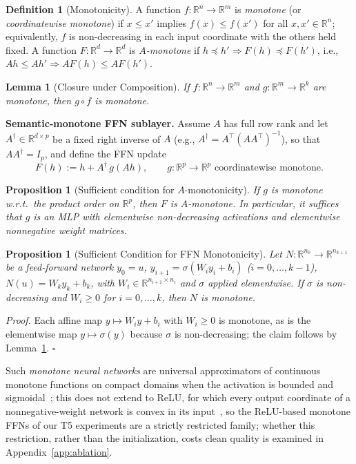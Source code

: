 \documentclass{article}
\theoremstyle{plain}
\newtheorem{proposition}[theorem]{Proposition}
\newtheorem{lemma}[theorem]{Lemma}
\theoremstyle{definition}
\newtheorem{definition}[theorem]{Definition}
\theoremstyle{remark}
\theoremstyle{plain}
\begin{document}
\begin{definition}[Monotonicity]
\label{def:monotone}
A function $f : \mathbb{R}^n \to \mathbb{R}^m$ is \emph{monotone} (or \emph{coordinatewise monotone}) if $x \le x'$ implies $f(x) \le f(x')$ for all $x, x' \in \mathbb{R}^n$; equivalently, $f$ is non-decreasing in each input coordinate with the others held fixed. A function $F:\mathbb{R}^d \to \mathbb{R}^d$ is \emph{$A$-monotone} if $h \preceq h' \Rightarrow F(h) \preceq F(h')$, i.e., $Ah \le Ah' \Rightarrow AF(h) \le AF(h')$.
\end{definition}

\begin{lemma}[Closure under Composition]
\label{lem:mono_comp}
If $f : \mathbb{R}^n \to \mathbb{R}^m$ and $g : \mathbb{R}^m \to \mathbb{R}^k$ are monotone, then $g \circ f$ is monotone.
\end{lemma}

\textbf{Semantic-monotone FFN sublayer.}
Assume $A$ has full row rank and let $A^\dagger \in \mathbb{R}^{d \times p}$ be a fixed right inverse of $A$ (e.g., $A^\dagger = A^\top(AA^\top)^{-1}$), so that $A A^\dagger = I_p$, and define the FFN update
\[
F(h) := h + A^\dagger\, g(Ah), \qquad g:\mathbb{R}^p \to \mathbb{R}^p \text{ coordinatewise monotone.}
\]

\begin{proposition}[Sufficient condition for $A$-monotonicity]
\label{prop:amono}
If $g$ is monotone w.r.t.\ the product order on $\mathbb{R}^p$, then $F$ is $A$-monotone.
In particular, it suffices that $g$ is an MLP with elementwise non-decreasing activations
and elementwise nonnegative weight matrices.
\end{proposition}

\begin{proposition}[Sufficient Condition for FFN Monotonicity]
\label{prop:ffn_mono}
Let $N : \mathbb{R}^{n_0} \to \mathbb{R}^{n_{k+1}}$ be a feed-forward network $y_0 = u$, $y_{i+1} = \sigma(W_i y_i + b_i)$ ($i = 0,\ldots,k-1$), $N(u) = W_k y_k + b_k$, with $W_i \in \mathbb{R}^{n_{i+1}\times n_i}$ and $\sigma$ applied elementwise. If $\sigma$ is non-decreasing and $W_i \ge 0$ for $i = 0,\ldots,k$, then $N$ is monotone.
\end{proposition}
\textit{Proof.} Each affine map $y \mapsto W_i y + b_i$ with $W_i \ge 0$ is monotone, as is the elementwise map $y \mapsto \sigma(y)$ because $\sigma$ is non-decreasing; the claim follows by Lemma~\ref{lem:mono_comp}. \hfill $\square$

Such \emph{monotone neural networks} are universal approximators of continuous monotone functions on compact domains when the activation is bounded and sigmoidal~\citep{Daniels2010Monotone}; this does not extend to ReLU, for which every output coordinate of a nonnegative-weight network is convex in its input~\citep{runje2023constrained}, so the ReLU-based monotone FFNs of our T5 experiments are a strictly restricted family; whether this restriction, rather than the initialization, costs clean quality is examined in Appendix~\ref{app:ablation}.
\end{document}
